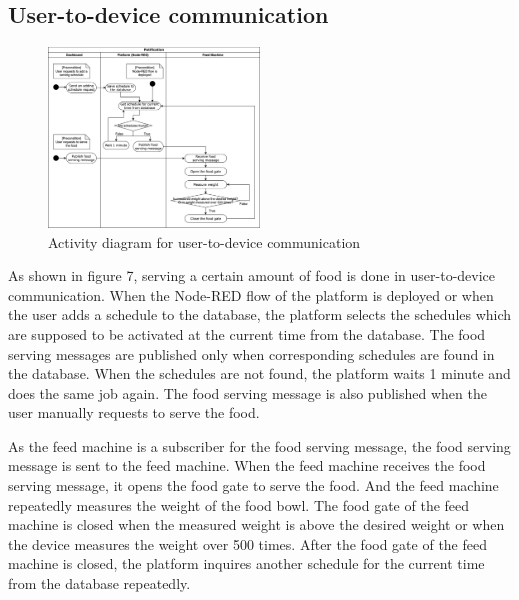 \documentclass[conference]{IEEEtran}
\begin{document}
\subsection{User-to-device communication}
\begin{figure}[htbp]
\centerline{\includegraphics[width=0.5\textwidth]{./images/user2device.png}}
\caption{Activity diagram for user-to-device communication}
\label{fig}
\end{figure}
As shown in figure 7, serving a certain amount of food is done in user-to-device communication. When the Node-RED flow of the platform is deployed or when the user adds a schedule to the database, the platform selects the schedules which are supposed to be activated at the current time from the database. The food serving messages are published only when corresponding schedules are found in the database. When the schedules are not found, the platform waits 1 minute and does the same job again. The food serving message is also published when the user manually requests to serve the food.

As the feed machine is a subscriber for the food serving message, the food serving message is sent to the feed machine. When the feed machine receives the food serving message, it opens the food gate to serve the food. And the feed machine repeatedly measures the weight of the food bowl. The food gate of the feed machine is closed when the measured weight is above the desired weight or when the device measures the weight over 500 times. After the food gate of the feed machine is closed, the platform inquires another schedule for the current time from the database repeatedly.
\end{document}
